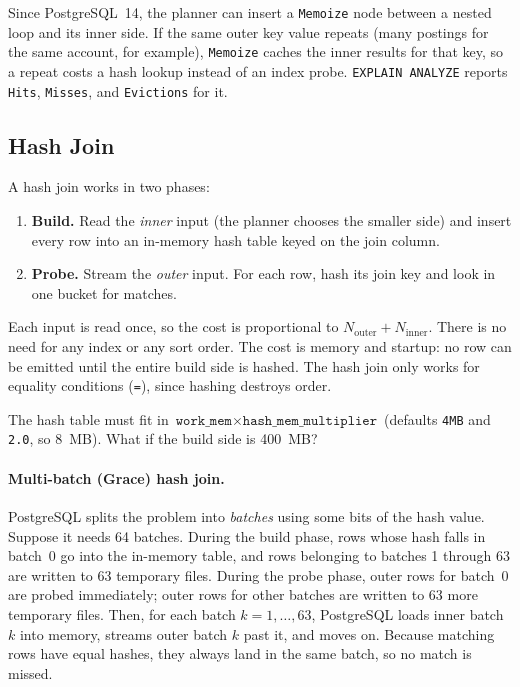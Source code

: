 Since PostgreSQL~14, the planner can insert a \texttt{Memoize} node between a nested loop and its inner side. If the same outer key value repeats (many postings for the same account, for example), \texttt{Memoize} caches the inner results for that key, so a repeat costs a hash lookup instead of an index probe. \texttt{EXPLAIN ANALYZE} reports \texttt{Hits}, \texttt{Misses}, and \texttt{Evictions} for it.

\subsection{Hash Join}

A hash join works in two phases:
\begin{enumerate}
  \item \textbf{Build.} Read the \emph{inner} input (the planner chooses the smaller side) and insert every row into an in-memory hash table keyed on the join column.
  \item \textbf{Probe.} Stream the \emph{outer} input. For each row, hash its join key and look in one bucket for matches.
\end{enumerate}
Each input is read once, so the cost is proportional to $N_{\text{outer}} + N_{\text{inner}}$. There is no need for any index or any sort order. The cost is memory and startup: no row can be emitted until the entire build side is hashed. The hash join only works for equality conditions (\texttt{=}), since hashing destroys order.

The hash table must fit in $\texttt{work\_mem} \times \texttt{hash\_mem\_multiplier}$ (defaults \texttt{4MB} and \texttt{2.0}, so 8~MB). What if the build side is 400~MB?

\paragraph{Multi-batch (Grace) hash join.} PostgreSQL splits the problem into \emph{batches} using some bits of the hash value. Suppose it needs 64 batches. During the build phase, rows whose hash falls in batch~0 go into the in-memory table, and rows belonging to batches 1 through 63 are written to 63 temporary files. During the probe phase, outer rows for batch~0 are probed immediately; outer rows for other batches are written to 63 more temporary files. Then, for each batch $k = 1, \ldots, 63$, PostgreSQL loads inner batch $k$ into memory, streams outer batch $k$ past it, and moves on. Because matching rows have equal hashes, they always land in the same batch, so no match is missed.

